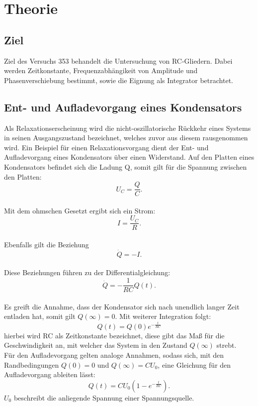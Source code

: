 \section{Theorie}
\label{sec:Theorie}
\subsection{Ziel}
Ziel des Versuchs 353 behandelt die Untersuchung von RC-Gliedern.
 Dabei werden Zeitkonstante, Frequenzabhängikeit von Amplitude und Phasenverschiebung bestimmt, sowie die Eignung als Integrator betrachtet.
\subsection{Ent- und Aufladevorgang eines Kondensators}
Als Relaxationserscheinung wird die nicht-oszillatorische Rückkehr eines Systems in seinen Ausgangszustand bezeichnet, welches zuvor aus diesem rausgenommen wird.
Ein Beispiel für einen Relaxationsvorgang dient der Ent- und Aufladevorgang eines Kondensators über einen Widerstand.
Auf den Platten eines Kondensators befindet sich die Ladung Q, somit gilt für die Spannung zwischen den Platten:\\
\begin{equation}
  U_C=\frac{Q}{C}.
\end{equation}\\
Mit dem ohmschen Gesetzt ergibt sich ein Strom:\\
\begin{equation}
  I=\frac{U_C}{R}.
\end{equation}\\
Ebenfalls gilt die Beziehung
\begin{equation}
  \dot Q= -I.
\end{equation}\\
Diese Beziehungen führen zu der Differentialgleichung:
\begin{equation}
  \dot Q= -\frac{1}{RC}  Q(t).
\end{equation}\\
Es greift die Annahme, dass der Kondensator sich nach unendlich langer Zeit entladen hat, somit gilt $Q(\infty)=0$. Mit weiterer Integration folgt:
\begin{equation}
  Q(t)=Q(0)e^{-\frac{t}{RC}}\label{eqn:entladung}
\end{equation}
hierbei wird RC als Zeitkonstante bezeichnet, diese gibt das Maß für die Geschwindigkeit an, mit welcher das System in den Zustand $Q(\infty)$ strebt.\\
Für den Aufladevorgang gelten analoge Annahmen, sodass sich, mit den Randbedingungen $Q(0)=0$ und $Q(\infty)=CU_0$, eine Gleichung für den Aufladevorgang ableiten lässt:
\begin{equation}
  Q(t)=CU_0\left(1-e^{-\frac{t}{RC}}\right).\label{eqn:aufladung}
  \end{equation}
  $U_0$ beschreibt die anliegende Spannung einer Spannungsquelle.
